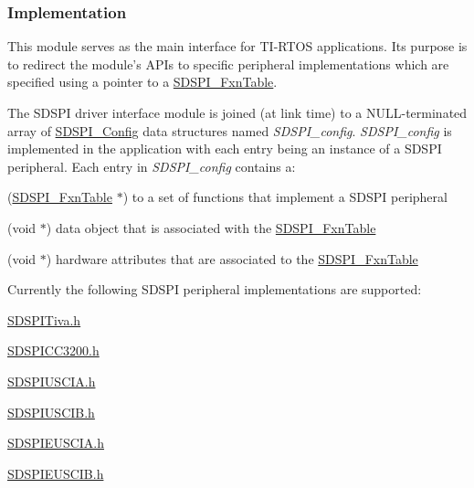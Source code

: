 \subsubsection*{Implementation}

This module serves as the main interface for T\-I-\/\-R\-T\-O\-S applications. Its purpose is to redirect the module's A\-P\-Is to specific peripheral implementations which are specified using a pointer to a \hyperlink{struct_s_d_s_p_i___fxn_table}{S\-D\-S\-P\-I\-\_\-\-Fxn\-Table}.

The S\-D\-S\-P\-I driver interface module is joined (at link time) to a N\-U\-L\-L-\/terminated array of \hyperlink{struct_s_d_s_p_i___config}{S\-D\-S\-P\-I\-\_\-\-Config} data structures named {\itshape S\-D\-S\-P\-I\-\_\-config}. {\itshape S\-D\-S\-P\-I\-\_\-config} is implemented in the application with each entry being an instance of a S\-D\-S\-P\-I peripheral. Each entry in {\itshape S\-D\-S\-P\-I\-\_\-config} contains a\-:
\begin{DoxyItemize}
\item (\hyperlink{struct_s_d_s_p_i___fxn_table}{S\-D\-S\-P\-I\-\_\-\-Fxn\-Table} $\ast$) to a set of functions that implement a S\-D\-S\-P\-I peripheral
\item (void $\ast$) data object that is associated with the \hyperlink{struct_s_d_s_p_i___fxn_table}{S\-D\-S\-P\-I\-\_\-\-Fxn\-Table}
\item (void $\ast$) hardware attributes that are associated to the \hyperlink{struct_s_d_s_p_i___fxn_table}{S\-D\-S\-P\-I\-\_\-\-Fxn\-Table}
\end{DoxyItemize}

Currently the following S\-D\-S\-P\-I peripheral implementations are supported\-:
\begin{DoxyItemize}
\item \hyperlink{_s_d_s_p_i_tiva_8h}{S\-D\-S\-P\-I\-Tiva.\-h}
\item \hyperlink{_s_d_s_p_i_c_c3200_8h}{S\-D\-S\-P\-I\-C\-C3200.\-h}
\item \hyperlink{_s_d_s_p_i_u_s_c_i_a_8h}{S\-D\-S\-P\-I\-U\-S\-C\-I\-A.\-h}
\item \hyperlink{_s_d_s_p_i_u_s_c_i_b_8h}{S\-D\-S\-P\-I\-U\-S\-C\-I\-B.\-h}
\item \hyperlink{_s_d_s_p_i_e_u_s_c_i_a_8h}{S\-D\-S\-P\-I\-E\-U\-S\-C\-I\-A.\-h}
\item \hyperlink{_s_d_s_p_i_e_u_s_c_i_b_8h}{S\-D\-S\-P\-I\-E\-U\-S\-C\-I\-B.\-h}
\end{DoxyItemize}

